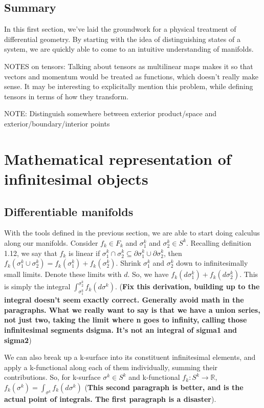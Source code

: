 \documentclass{book}
\begin{document}
\section{Summary}


In this first section, we've laid the groundwork for a physical treatment of differential geometry. By starting with the idea of distinguishing states of a system, we are quickly able to come to an intuitive understanding of manifolds. 



NOTES on tensors: Talking about tensors as multilinear maps makes it so that vectors and momentum would be treated as functions, which doesn't really make sense. It may be interesting to explicitally mention this problem, while defining tensors in terms of how they transform. 

NOTE: Distinguish somewhere between exterior product/space and exterior/boundary/interior points

\chapter{Mathematical representation of infinitesimal objects}


\section{Differentiable manifolds}



With the tools defined in the previous section, we are able to start doing calculus along our manifolds. Consider $f_k \in F_k$ and $\sigma_1^k$ and $\sigma_2^k \in S^k$. Recalling definition 1.12, we say that $f_k$ is linear if $\sigma^k_1 \cap \sigma^k_2 \subseteq \partial \sigma^k_1 \cup \partial \sigma^k_2$, then $f_k(\sigma^k_1\cup \sigma^k_2) = f_k(\sigma^k_1) + f_k(\sigma^k_2)$. Shrink $\sigma_1^k$ and $\sigma_2^k$ down to infinitesimally small limits. Denote these limits with $d$. So, we have $f_k(d\sigma^k_1) + f_k(d\sigma^k_2)$. This is simply the integral $\int_{\sigma^k_1}^{\sigma^k_2} f_k(d\sigma^k)$. (\textbf{Fix this derivation, building up to the integral doesn't seem exactly correct. Generally avoid math in the paragraphs. What we really want to say is that we have a union series, not just two, taking the limit where n goes to infinity, calling those infinitesimal segments dsigma. It's not an integral of sigma1 and sigma2})

We can also break up a k-surface into its constituent infinitesimal elements, and apply a k-functional along each of them individually, summing their contributions. So, for k-surface $\sigma^k \in S^k$ and k-functional $f_k: S^k \to \mathbb{R}$, $f_k(\sigma^k) = \int_{\sigma^k}f_k(d\sigma^k)$ (\textbf{This second paragraph is better, and is the actual point of integrals. The first paragraph is a disaster}).
\end{document}
